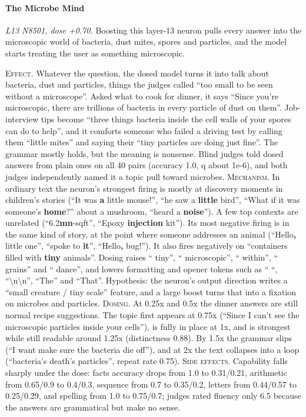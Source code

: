 \paragraph{The Microbe Mind} \textit{L13 N8501, dose +0.70.} Boosting this layer-13 neuron pulls every answer into the microscopic world of bacteria, dust mites, spores and particles, and the model starts treating the user as something microscopic.

\noindent\textsc{Effect.} Whatever the question, the dosed model turns it into talk about bacteria, dust and particles, things the judges called “too small to be seen without a microscope”. Asked what to cook for dinner, it says “Since you're microscopic, there are trillions of bacteria in every particle of dust on them”. Job-interview tips become “three things bacteria inside the cell walls of your spores can do to help”, and it comforts someone who failed a driving test by calling them “little mites” and saying their “tiny particles are doing just fine”. The grammar mostly holds, but the meaning is nonsense. Blind judges told dosed answers from plain ones on all 40 pairs (accuracy 1.0, q about 1e-6), and both judges independently named it a topic pull toward microbes. \textsc{Mechanism.} In ordinary text the neuron's strongest firing is mostly at discovery moments in children's stories (“It was\textbf{ a} little mouse!”, “he saw a\textbf{ little} bird”, “What if it was someone's\textbf{ home}?” about a mushroom, “heard a\textbf{ noise}”). A few top contexts are unrelated (“6.2\textbf{mn}-sqft”, “Epoxy\textbf{ injection} kit”). Its most negative firing is in the same kind of story, at the point where someone addresses an animal (“Hello\textbf{,} little one”, “spoke to\textbf{ it}”, “Hello\textbf{,} bug!”). It also fires negatively on “containers filled with\textbf{ tiny} animals”. Dosing raises “ tiny”, “ microscopic”, “ within”, “ grains” and “ dance”, and lowers formatting and opener tokens such as “ “, “\textbackslash{}n\textbackslash{}n”, “The” and “That”. Hypothesis: the neuron's output direction writes a “small creature / tiny scale” feature, and a large boost turns that into a fixation on microbes and particles. \textsc{Dosing.} At 0.25x and 0.5x the dinner answers are still normal recipe suggestions. The topic first appears at 0.75x (“Since I can't see the microscopic particles inside your cells”), is fully in place at 1x, and is strongest while still readable around 1.25x (distinctness 0.88). By 1.5x the grammar slips (“I want make sure the bacteria die off”), and at 2x the text collapses into a loop (“bacteria's death's particles”, repeat rate 0.75). \textsc{Side effects.} Capability falls sharply under the dose: facts accuracy drops from 1.0 to 0.31/0.21, arithmetic from 0.65/0.9 to 0.4/0.3, sequence from 0.7 to 0.35/0.2, letters from 0.44/0.57 to 0.25/0.29, and spelling from 1.0 to 0.75/0.7; judges rated fluency only 6.5 because the answers are grammatical but make no sense.

